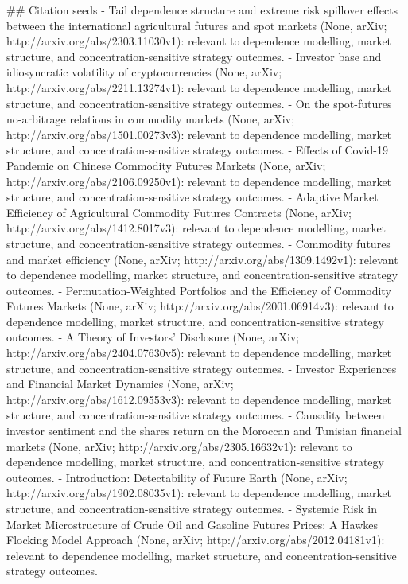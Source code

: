 \documentclass[11pt]{article}
\begin{document}
## Citation seeds
- Tail dependence structure and extreme risk spillover effects between the international agricultural futures and spot markets (None, arXiv; http://arxiv.org/abs/2303.11030v1): relevant to dependence modelling, market structure, and concentration-sensitive strategy outcomes.
- Investor base and idiosyncratic volatility of cryptocurrencies (None, arXiv; http://arxiv.org/abs/2211.13274v1): relevant to dependence modelling, market structure, and concentration-sensitive strategy outcomes.
- On the spot-futures no-arbitrage relations in commodity markets (None, arXiv; http://arxiv.org/abs/1501.00273v3): relevant to dependence modelling, market structure, and concentration-sensitive strategy outcomes.
- Effects of Covid-19 Pandemic on Chinese Commodity Futures Markets (None, arXiv; http://arxiv.org/abs/2106.09250v1): relevant to dependence modelling, market structure, and concentration-sensitive strategy outcomes.
- Adaptive Market Efficiency of Agricultural Commodity Futures Contracts (None, arXiv; http://arxiv.org/abs/1412.8017v3): relevant to dependence modelling, market structure, and concentration-sensitive strategy outcomes.
- Commodity futures and market efficiency (None, arXiv; http://arxiv.org/abs/1309.1492v1): relevant to dependence modelling, market structure, and concentration-sensitive strategy outcomes.
- Permutation-Weighted Portfolios and the Efficiency of Commodity Futures Markets (None, arXiv; http://arxiv.org/abs/2001.06914v3): relevant to dependence modelling, market structure, and concentration-sensitive strategy outcomes.
- A Theory of Investors' Disclosure (None, arXiv; http://arxiv.org/abs/2404.07630v5): relevant to dependence modelling, market structure, and concentration-sensitive strategy outcomes.
- Investor Experiences and Financial Market Dynamics (None, arXiv; http://arxiv.org/abs/1612.09553v3): relevant to dependence modelling, market structure, and concentration-sensitive strategy outcomes.
- Causality between investor sentiment and the shares return on the Moroccan and Tunisian financial markets (None, arXiv; http://arxiv.org/abs/2305.16632v1): relevant to dependence modelling, market structure, and concentration-sensitive strategy outcomes.
- Introduction: Detectability of Future Earth (None, arXiv; http://arxiv.org/abs/1902.08035v1): relevant to dependence modelling, market structure, and concentration-sensitive strategy outcomes.
- Systemic Risk in Market Microstructure of Crude Oil and Gasoline Futures Prices: A Hawkes Flocking Model Approach (None, arXiv; http://arxiv.org/abs/2012.04181v1): relevant to dependence modelling, market structure, and concentration-sensitive strategy outcomes.
\end{document}
